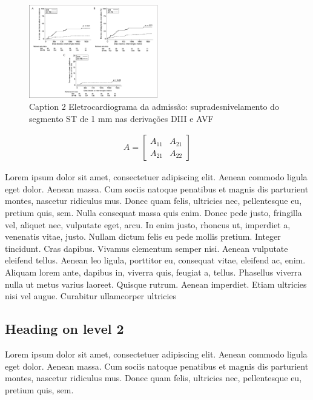 \begin{figure}[h]
	\centering
	\includegraphics[width=0.5\textwidth]{temp.png}
	\caption{Caption 2 Eletrocardiograma da admissão: supradesnivelamento do segmento ST de 1 mm nas derivações DIII e AVF}
	\label{Figura 2}
\end{figure}

\begin{align}
	A = 
	\begin{bmatrix}
	A_{11} & A_{21} \\
  	A_{21} & A_{22}
	\end{bmatrix}
\end{align}

Lorem ipsum dolor sit amet, consectetuer adipiscing elit. Aenean commodo ligula
eget dolor. Aenean massa. Cum sociis natoque penatibus et magnis dis parturient
montes, nascetur ridiculus mus. Donec quam felis, ultricies nec, pellentesque
eu, pretium quis, sem. Nulla consequat massa quis enim. Donec pede justo,
fringilla vel, aliquet nec, vulputate eget, arcu. In enim justo, rhoncus ut,
imperdiet a, venenatis vitae, justo. Nullam dictum felis eu pede mollis
pretium. Integer tincidunt. Cras dapibus. Vivamus elementum semper nisi. Aenean
vulputate eleifend tellus. Aenean leo ligula, porttitor eu, consequat vitae,
eleifend ac, enim. Aliquam lorem ante, dapibus in, viverra quis, feugiat a,
tellus. Phasellus viverra nulla ut metus varius laoreet. Quisque rutrum. Aenean
imperdiet. Etiam ultricies nisi vel augue. Curabitur ullamcorper ultricies 

\subsection*{Heading on level 2}

Lorem ipsum dolor sit amet, consectetuer adipiscing elit. Aenean commodo ligula
eget dolor. Aenean massa. Cum sociis natoque penatibus et magnis dis parturient
montes, nascetur ridiculus mus. Donec quam felis, ultricies nec, pellentesque
eu, pretium quis, sem. 

